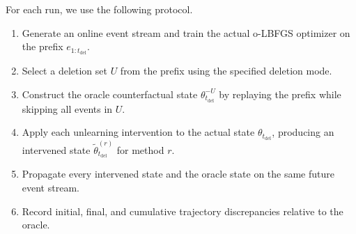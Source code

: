 \documentclass{ssl}
\begin{document}
For each run, we use the following protocol.
\begin{enumerate}
    \item Generate an online event stream and train the actual o-LBFGS optimizer on the prefix \(e_{1:t_{\mathrm{del}}}\).
    \item Select a deletion set \(U\) from the prefix using the specified deletion mode.
    \item Construct the oracle counterfactual state \(\theta_{t_{\mathrm{del}}}^{-U}\) by replaying the prefix while skipping all events in \(U\).
    \item Apply each unlearning intervention to the actual state \(\theta_{t_{\mathrm{del}}}\), producing an intervened state \(\tilde\theta_{t_{\mathrm{del}}}^{(r)}\) for method \(r\).
    \item Propagate every intervened state and the oracle state on the same future event stream.
    \item Record initial, final, and cumulative trajectory discrepancies relative to the oracle.
\end{enumerate}
\end{document}
